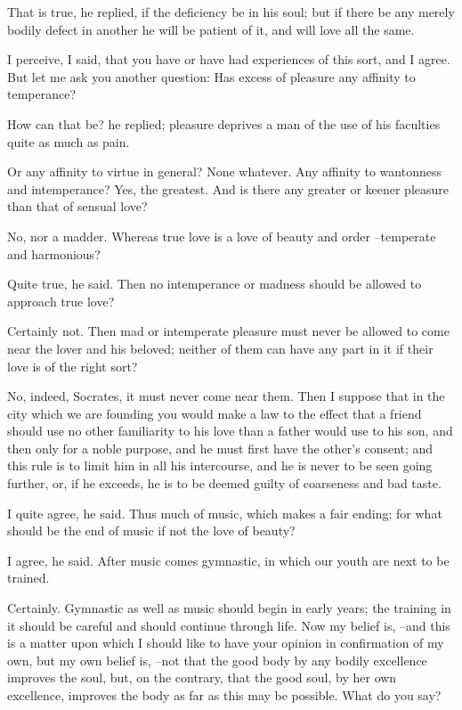 That is true, he replied, if the deficiency be in his soul; but if there be any merely bodily defect in another he will be patient of it, and will love all the same.

I perceive, I said, that you have or have had experiences of this sort, and I agree. But let me ask you another question: Has excess of pleasure any affinity to temperance?

How can that be? he replied; pleasure deprives a man of the use of his faculties quite as much as pain.

Or any affinity to virtue in general?
None whatever.
Any affinity to wantonness and intemperance?
Yes, the greatest.
And is there any greater or keener pleasure than that of sensual love?

No, nor a madder.
Whereas true love is a love of beauty and order --temperate and harmonious?

Quite true, he said.
Then no intemperance or madness should be allowed to approach true love?

Certainly not.
Then mad or intemperate pleasure must never be allowed to come near the lover and his beloved; neither of them can have any part in it if their love is of the right sort?

No, indeed, Socrates, it must never come near them.
Then I suppose that in the city which we are founding you would make a law to the effect that a friend should use no other familiarity to his love than a father would use to his son, and then only for a noble purpose, and he must first have the other's consent; and this rule is to limit him in all his intercourse, and he is never to be seen going further, or, if he exceeds, he is to be deemed guilty of coarseness and bad taste.

I quite agree, he said.
Thus much of music, which makes a fair ending; for what should be the end of music if not the love of beauty?

I agree, he said.
After music comes gymnastic, in which our youth are next to be trained.

Certainly.
Gymnastic as well as music should begin in early years; the training in it should be careful and should continue through life. Now my belief is, --and this is a matter upon which I should like to have your opinion in confirmation of my own, but my own belief is, --not that the good body by any bodily excellence improves the soul, but, on the contrary, that the good soul, by her own excellence, improves the body as far as this may be possible. What do you say?


